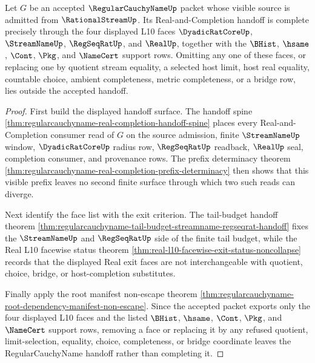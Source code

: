 \begin{theorem}
\label{thm:regularcauchyname-facewise-exit-handoff-completeness}
Let $G$ be an accepted $\RegularCauchyNameUp$ packet whose visible source is admitted from $\RationalStreamUp$. Its Real-and-Completion handoff is complete precisely through the four displayed L10 faces $\DyadicRatCoreUp$, $\StreamNameUp$, $\RegSeqRatUp$, and $\RealUp$, together with the $\BHist$, $\hsame$, $\Cont$, $\Pkg$, and $\NameCert$ support rows. Omitting any one of these faces, or replacing one by quotient stream equality, a selected host limit, host real equality, countable choice, ambient completeness, metric completeness, or a bridge row, lies outside the accepted handoff.
\end{theorem}
\begin{proof}
First build the displayed handoff surface. The handoff spine \autoref{thm:regularcauchyname-real-completion-handoff-spine} places every Real-and-Completion consumer read of $G$ on the source admission, finite $\StreamNameUp$ window, $\DyadicRatCoreUp$ radius row, $\RegSeqRatUp$ readback, $\RealUp$ seal, completion consumer, and provenance rows. The prefix determinacy theorem \autoref{thm:regularcauchyname-real-completion-prefix-determinacy} then shows that this visible prefix leaves no second finite surface through which two such reads can diverge.

Next identify the face list with the exit criterion. The tail-budget handoff theorem \autoref{thm:regularcauchyname-tail-budget-streamname-regseqrat-handoff} fixes the $\StreamNameUp$ and $\RegSeqRatUp$ side of the finite tail budget, while the Real L10 facewise status theorem \autoref{thm:real-l10-facewise-exit-status-noncollapse} records that the displayed Real exit faces are not interchangeable with quotient, choice, bridge, or host-completion substitutes.

Finally apply the root manifest non-escape theorem \autoref{thm:regularcauchyname-root-dependency-manifest-non-escape}. Since the accepted packet exports only the four displayed L10 faces and the listed $\BHist$, $\hsame$, $\Cont$, $\Pkg$, and $\NameCert$ support rows, removing a face or replacing it by any refused quotient, limit-selection, equality, choice, completeness, or bridge coordinate leaves the RegularCauchyName handoff rather than completing it.
\end{proof}

